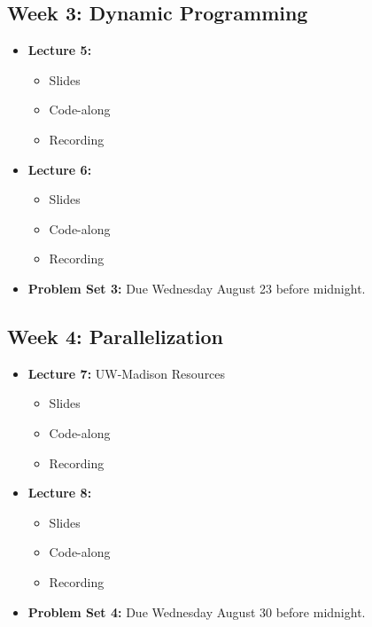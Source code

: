 \documentclass[
]{book}
\providecommand{\tightlist}{%
  \setlength{\itemsep}{0pt}\setlength{\parskip}{0pt}}
\begin{document}
\hypertarget{week-3-dynamic-programming}{%
\subsection{Week 3: Dynamic Programming}\label{week-3-dynamic-programming}}

\begin{itemize}
\tightlist
\item
  \textbf{Lecture 5:}

  \begin{itemize}
  \tightlist
  \item
    Slides
  \item
    Code-along
  \item
    Recording
  \end{itemize}
\item
  \textbf{Lecture 6:}

  \begin{itemize}
  \tightlist
  \item
    Slides
  \item
    Code-along
  \item
    Recording
  \end{itemize}
\item
  \textbf{Problem Set 3:} Due Wednesday August 23 before midnight.
\end{itemize}

\hypertarget{week-4-parallelization}{%
\subsection{Week 4: Parallelization}\label{week-4-parallelization}}

\begin{itemize}
\tightlist
\item
  \textbf{Lecture 7:} UW-Madison Resources

  \begin{itemize}
  \tightlist
  \item
    Slides
  \item
    Code-along
  \item
    Recording
  \end{itemize}
\item
  \textbf{Lecture 8:}

  \begin{itemize}
  \tightlist
  \item
    Slides
  \item
    Code-along
  \item
    Recording
  \end{itemize}
\item
  \textbf{Problem Set 4:} Due Wednesday August 30 before midnight.
\end{itemize}
\end{document}
